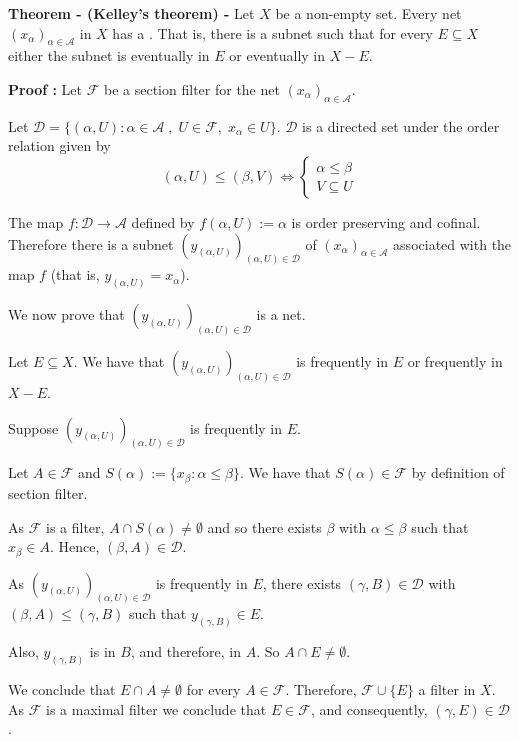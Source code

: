\documentclass[12pt]{article}
\begin{document}
{\bf Theorem - (Kelley's theorem) -} Let $X$ be a non-empty set. Every net $(x_{\alpha})_{\alpha \in \mathcal{A}}$ in $X$ has a . That is, there is a subnet such that for every $E \subseteq X$ either the subnet is eventually in $E$ or eventually in $X-E$.

{\bf Proof :} Let $\mathcal{F}$ be a section filter for the net $(x_{\alpha})_{\alpha \in \mathcal{A}}$.

 Let $\mathcal{D}=\{(\alpha,U):\alpha \in \mathcal{A}\;,\; U \in \mathcal{F},\; x_{\alpha} \in U \}$. $\mathcal{D}$ is a directed set under the order relation given by
\begin{displaymath}
(\alpha,U) \leq (\beta,V) \Longleftrightarrow \begin{cases}  
  \alpha \leq \beta \\
  V \subseteq U
\end{cases}
\end{displaymath}

The map $f:\mathcal{D} \longrightarrow \mathcal{A}$ defined by $f(\alpha,U):=\alpha$ is order preserving and cofinal. Therefore there is a subnet $(y_{(\alpha,U)})_{(\alpha,U) \in \mathcal{D}}$ of $(x_{\alpha})_{\alpha \in \mathcal{A}}$ associated with the map $f$ (that is, $y_{(\alpha,U)} = x_{\alpha}$).

We now prove that $(y_{(\alpha,U)})_{(\alpha,U) \in \mathcal{D}}$ is a  net.

Let $E \subseteq X$. We have that $(y_{(\alpha,U)})_{(\alpha,U) \in \mathcal{D}}$ is frequently in $E$ or frequently in $X-E$.

Suppose $(y_{(\alpha,U)})_{(\alpha,U) \in \mathcal{D}}$ is frequently in $E$.

Let $A \in \mathcal{F}$ and $S(\alpha):=\{x_{\beta}:\alpha \leq \beta\}$. We have that $S(\alpha) \in \mathcal{F}$ by definition of section filter.

As $\mathcal{F}$ is a filter, $A \cap S(\alpha) \neq \emptyset$ and so there exists $\beta$ with $\alpha \leq \beta$ such that $x_{\beta} \in A$. Hence, $(\beta,A) \in \mathcal{D}$.

As $(y_{(\alpha,U)})_{(\alpha,U) \in \mathcal{D}}$ is frequently in $E$, there exists $(\gamma,B) \in \mathcal{D}$ with $(\beta,A) \leq (\gamma,B)$ such that $y_{(\gamma,B)} \in E$.

Also, $y_{(\gamma,B)}$ is in $B$, and therefore, in $A$. So $A \cap E \neq \emptyset$.

We conclude that $E \cap A \neq \emptyset$ for every $A \in \mathcal{F}$. Therefore, $\mathcal{F} \cup \{E\}$  a filter in $X$. As $\mathcal{F}$ is a maximal filter we conclude that $E \in \mathcal{F}$, and consequently, $(\gamma,E) \in \mathcal{D}$.
\end{document}
